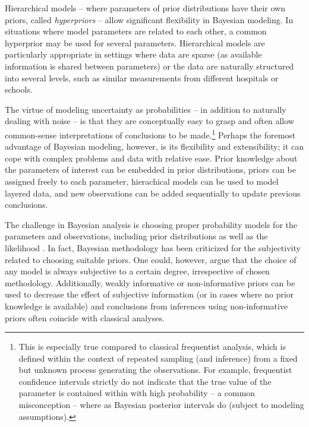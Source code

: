 Hierarchical models -- where parameters of prior distributions have their own
priors, called \emph{hyperpriors} -- allow significant flexibility in Bayesian
modeling. In situations where model parameters are related to each other, a
common hyperprior may be used for several parameters. Hierarchical models are
particularly appropriate in settings where data are sparse (as available
information is shared between parameters) or the data are naturally structured
into several levels, such as similar measurements from different hospitals or
schools.

The virtue of modeling uncertainty as probabilities -- in addition to
naturally dealing with noise -- is that they are conceptually easy to grasp
and often allow common-sense interpretations of conclusions to be
made.\footnote{This is especially true compared to classical frequentist analysis,
which is defined within the context of repeated sampling (and inference) from
a fixed but unknown process generating the observations. For example,
frequentist confidence intervals strictly do not indicate that the true value
of the parameter is contained within with high probability -- a common
misconception -- where as Bayesian posterior intervals do (subject to modeling
assumptions).} Perhaps the foremost advantage of Bayesian modeling,
however, is its flexibility and extensibility; it can cope with complex
problems and data with relative ease. Prior knowledge about the parameters of
interest can be embedded in prior distributions, priors can be assigned freely
to each parameter, hierachical models can be used to model layered data, and
new observations can be added sequentially to update previous conclusions.

The challenge in Bayesian analysis is choosing proper probability models for
the parameters and observations, including prior distributions as well as the
likelihood \citep{Gelman2013}. In fact, Bayesian methodology has been
criticized for the subjectivity related to choosing suitable priors. One could, however,
argue that the choice of any model is always subjective to a certain degree,
irrespective of chosen methodology. Additionally, weakly informative or non-informative
priors can be used to decrease the effect of subjective information (or
in cases where no prior knowledge is available) and conclusions from
inferences using non-informative priors often coincide with classical
analyses.


